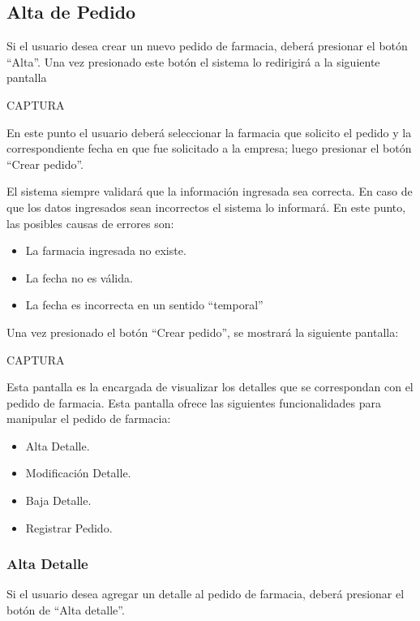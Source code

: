 \documentclass[letterpaper,10pt,spanish]{sphinxmanual}
\begin{document}
\subsection{Alta de Pedido}
\label{pedidosfarmacia:alta-de-pedido}
Si el usuario desea crear un nuevo pedido de farmacia, deberá presionar el botón “Alta”. Una vez presionado este botón el sistema lo redirigirá a la siguiente pantalla

CAPTURA

En este punto el usuario deberá seleccionar la farmacia que solicito el pedido y la correspondiente fecha en que fue solicitado a la empresa; luego presionar el botón “Crear pedido”.

El sistema siempre validará que la información ingresada sea correcta. En caso de que los datos ingresados sean incorrectos el sistema lo informará.
En este punto, las posibles causas de errores son:
\begin{itemize}
\item {} 
La farmacia ingresada no existe.

\item {} 
La fecha no es válida.

\item {} 
La fecha es incorrecta en un sentido “temporal”

\end{itemize}

Una vez presionado el botón “Crear pedido”, se mostrará la siguiente pantalla:

CAPTURA

Esta pantalla es la encargada de visualizar los detalles que se correspondan con el pedido de farmacia.
Esta pantalla ofrece las siguientes funcionalidades para manipular el pedido de farmacia:
\begin{itemize}
\item {} 
Alta Detalle.

\item {} 
Modificación Detalle.

\item {} 
Baja Detalle.

\item {} 
Registrar Pedido.

\end{itemize}


\subsubsection{Alta Detalle}
\label{pedidosfarmacia:alta-detalle}
Si el usuario desea agregar un detalle al pedido de farmacia, deberá presionar el botón de “Alta detalle”.
\end{document}
